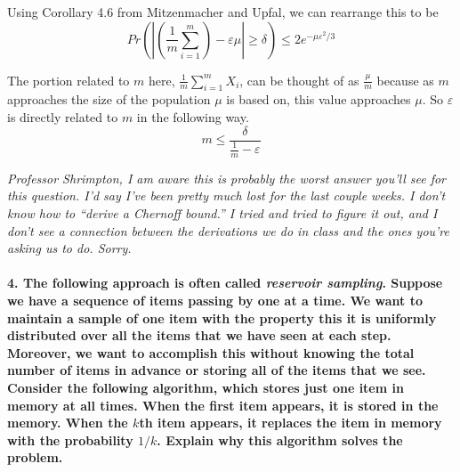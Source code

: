 \documentclass{article}
\begin{document}
Using Corollary 4.6 from Mitzenmacher and Upfal, we can rearrange this to be
\begin{equation*}
Pr\left(\left|\left(\frac{1}{m}\sum_{i=1}^m\right)-\varepsilon\mu\right| 
\geq\delta\right)\leq 2e^{-\mu\varepsilon^2/3}
\end{equation*}

The portion related to $m$ here, $\frac{1}{m}\sum\limits_{i=1}^m X_i$, can be
thought of as $\frac{\mu}{m}$ because as $m$ approaches the size of the 
population $\mu$ is based on, this value approaches $\mu$. So $\varepsilon$ is
directly related to $m$ in the following way.
\begin{equation*}
m \leq \frac{\delta}{\frac{1}{m}-\varepsilon}
\end{equation*}

\emph{Professor Shrimpton, I am aware this is probably the worst answer you'll
see for this question. I'd say I've been pretty much lost for the last couple
weeks. I don't know how to ``derive a Chernoff bound.'' I tried and tried to
figure it out, and I don't see a connection between the derivations we do in
class and the ones you're asking us to do. Sorry.}

\paragraph{4. The following approach is often called \emph{reservoir sampling}. 
Suppose we have a sequence of items passing by one at a time. We want to 
maintain a sample of one item with the property this it is uniformly 
distributed over all the items that we have seen at each step. Moreover, we 
want to accomplish this without knowing the total number of items in advance or 
storing all of the items that we see.\\
Consider the following algorithm, which stores just one item in memory at all 
times. When the first item appears, it is stored in the memory. When the $k$th 
item appears, it replaces the item in memory with the probability $1/k$. 
Explain why this algorithm solves the problem.}
\end{document}

